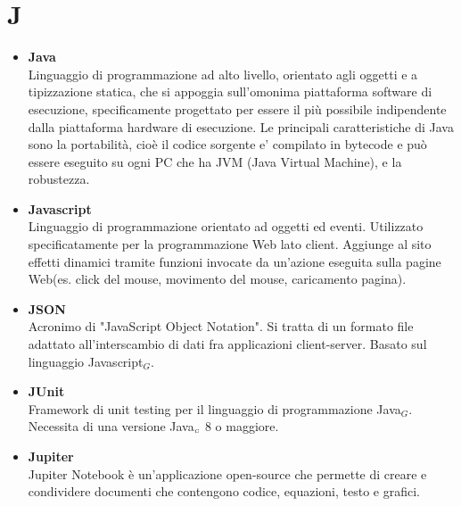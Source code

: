 \chapter{J} \label{J}
\begin{itemize}
	\item \textbf{Java} \\
	 Linguaggio di programmazione ad alto livello, orientato agli oggetti e a tipizzazione statica, che si appoggia sull'omonima piattaforma software di esecuzione, specificamente progettato per essere il più possibile indipendente dalla piattaforma hardware di esecuzione. Le principali caratteristiche di Java sono la portabilità, cioè il codice sorgente e' compilato in bytecode e può essere eseguito su ogni PC che ha JVM (Java Virtual Machine), e la robustezza.

	 \item \textbf{Javascript} \\
	 Linguaggio di programmazione orientato ad oggetti ed eventi.
	 Utilizzato specificatamente per la programmazione Web lato client.
	 Aggiunge al sito effetti dinamici tramite funzioni invocate da un'azione eseguita sulla pagine Web(es. click del mouse, movimento del mouse, caricamento pagina).

	 \item \textbf{JSON} \\
	 Acronimo di "JavaScript Object Notation".
	 Si tratta di un formato file adattato all'interscambio di dati fra applicazioni client-server.
	 Basato sul linguaggio Javascript$_G$.

	 \item \textbf{JUnit} \\
	 Framework di unit testing per il linguaggio di programmazione Java$_G$.
	 Necessita di una versione Java$_{\scaleto{G}{3pt}}$ 8 o maggiore.
	 
	 \item \textbf{Jupiter}\\
	 Jupiter Notebook è un'applicazione open-source che permette di creare e condividere documenti che contengono codice, equazioni, testo e grafici.
\end{itemize}
